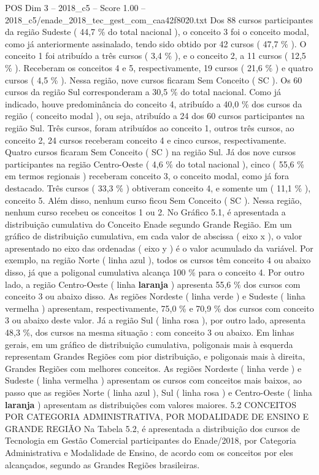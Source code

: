 \begin{textsample}{POS Dim 3 – 2018\_c5 – Score 1.00 – 2018\_c5/enade\_2018\_tec\_gest\_com\_caa42f8020.txt}
Dos 88 cursos participantes da região Sudeste ( 44,7 \% do total nacional ), o conceito 3 foi o conceito modal, como já anteriormente assinalado, tendo sido obtido por 42 cursos ( 47,7 \% ).
O conceito 1 foi atribuído a três cursos ( 3,4 \% ), e o conceito 2, a 11 cursos ( 12,5 \% ).
Receberam os conceitos 4 e 5, respectivamente, 19 cursos ( 21,6 \% ) e quatro cursos ( 4,5 \% ).
Nessa região, nove cursos ficaram Sem Conceito ( SC ).
Os 60 cursos da região Sul corresponderam a 30,5 \% do total nacional.
Como já indicado, houve predominância do conceito 4, atribuído a 40,0 \% dos cursos da região ( conceito modal ), ou seja, atribuído a 24 dos 60 cursos participantes na região Sul.
Três cursos, foram atribuídos ao conceito 1, outros três cursos, ao conceito 2, 24 cursos receberam conceito 4 e cinco cursos, respectivamente.
Quatro cursos ficaram Sem Conceito ( SC ) na região Sul.
Já dos nove cursos participantes na região Centro-Oeste ( 4,6 \% do total nacional ), cinco ( 55,6 \% em termos regionais ) receberam conceito 3, o conceito modal, como já fora destacado.
Três cursos ( 33,3 \% ) obtiveram conceito 4, e somente um ( 11,1 \% ), conceito 5.
Além disso, nenhum curso ficou Sem Conceito ( SC ).
Nessa região, nenhum curso recebeu os conceitos 1 ou 2.
No Gráfico 5.1, é apresentada a distribuição cumulativa do Conceito Enade segundo Grande Região.
Em um gráfico de distribuição cumulativa, em cada valor de abscissa ( eixo x ), o valor apresentado no eixo das ordenadas ( eixo y ) é o valor acumulado da variável.
Por exemplo, na região Norte ( linha azul ), todos os cursos têm conceito 4 ou abaixo disso, já que a poligonal cumulativa alcança 100 \% para o conceito 4.
Por outro lado, a região Centro-Oeste ( linha \textbf{laranja} ) apresenta 55,6 \% dos cursos com conceito 3 ou abaixo disso.
As regiões Nordeste ( linha verde ) e Sudeste ( linha vermelha ) apresentam, respectivamente, 75,0 \% e 70,9 \% dos cursos com conceito 3 ou abaixo deste valor.
Já a região Sul ( linha rosa ), por outro lado, apresenta 48,3 \%, dos cursos na mesma situação : com conceito 3 ou abaixo.
Em linhas gerais, em um gráfico de distribuição cumulativa, poligonais mais à esquerda representam Grandes Regiões com pior distribuição, e poligonais mais à direita, Grandes Regiões com melhores conceitos.
As regiões Nordeste ( linha verde ) e Sudeste ( linha vermelha ) apresentam os cursos com conceitos mais baixos, ao passo que as regiões Norte ( linha azul ), Sul ( linha rosa ) e Centro-Oeste ( linha \textbf{laranja} ) apresentam as distribuições com valores maiores. 5.2 CONCEITOS POR CATEGORIA ADMINISTRATIVA, POR MODALIDADE DE ENSINO E GRANDE REGIÃO Na Tabela 5.2, é apresentada a distribuição dos cursos de Tecnologia em Gestão Comercial participantes do Enade/2018, por Categoria Administrativa e Modalidade de Ensino, de acordo com os conceitos por eles alcançados, segundo as Grandes Regiões brasileiras.

\end{textsample}
